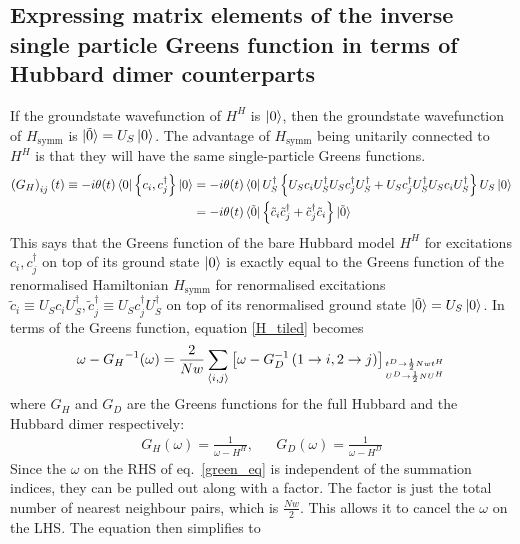 \documentclass[12pt]{article}
\numberwithin{equation}{section}
\begin{document}
\subsection{Expressing matrix elements of the inverse single particle Greens function in terms of Hubbard dimer counterparts}
If the groundstate wavefunction of $H^H$ is $\ket{0}$, then the groundstate wavefunction of $H_\text{symm}$ is $\ket{\tilde 0} = U_S\ket{0}$. The advantage of $H_\text{symm}$ being unitarily connected to $H^H$ is that they will have the same single-particle Greens functions.
\begin{equation}\begin{aligned}
	\left(G_H\right)_{ij}(t) \equiv -i\theta(t)\bra{0}\left\{c_i,c^\dagger_j \right\}\ket{0} &= -i\theta(t)\bra{0}U_S^\dagger\left\{ U_S c_i U_S^\dagger U_S c^\dagger_j U_S^\dagger + U_S c^\dagger_j U_S^\dagger U_S c_i U_S^\dagger\right\}U_S\ket{0}\\
												 &=-i\theta(t)\bra{\tilde 0}\left\{\tilde c_i \tilde c^\dagger_j + \tilde c^\dagger_j \tilde c_i \right\}\ket{\tilde 0}
\end{aligned}\end{equation}
This says that the Greens function of the bare Hubbard model $H^H$ for excitations $c_i,c^\dagger_j$ on top of its ground state $\ket{0}$ is exactly equal to the Greens function of the renormalised Hamiltonian $H_\text{symm}$ for renormalised excitations $\tilde c_i \equiv U_S c_i U_S^\dagger, \tilde c_j^\dagger \equiv U_S c^\dagger_j U_S^\dagger$ on top of its renormalised ground state $\ket{\tilde 0} = U_S \ket{0}$.
In terms of the Greens function, equation \ref{H_tiled} becomes
\begin{equation}\begin{aligned}
	\label{green_eq}
	\omega - {G_H}^{-1}(\omega) = \frac{2}{Nw}\sum_{\left<i,j\right>}\left[\omega - G_D^{-1}\left(1 \to i, 2 \to j\right)\right]_{t^D \to \frac{1}{2}Nwt^H \atop{U^D \to \frac{1}{2}N U^H}}
\end{aligned}\end{equation}
where $G_H$ and $G_D$ are the Greens functions for the full Hubbard and the Hubbard dimer respectively:
\begin{equation}\begin{aligned}
	G_H(\omega) = \frac{1}{\omega - H^H}, && G_D(\omega) = \frac{1}{\omega - H^D}
\end{aligned}\end{equation}
Since the $\omega$ on the RHS of eq.~\ref{green_eq} is independent of the summation indices, they can be pulled out along with a factor. The factor is just the total number of nearest neighbour pairs, which is $\frac{Nw}{2}$. This allows it to cancel the $\omega$ on the LHS. The equation then simplifies to
\end{document}
